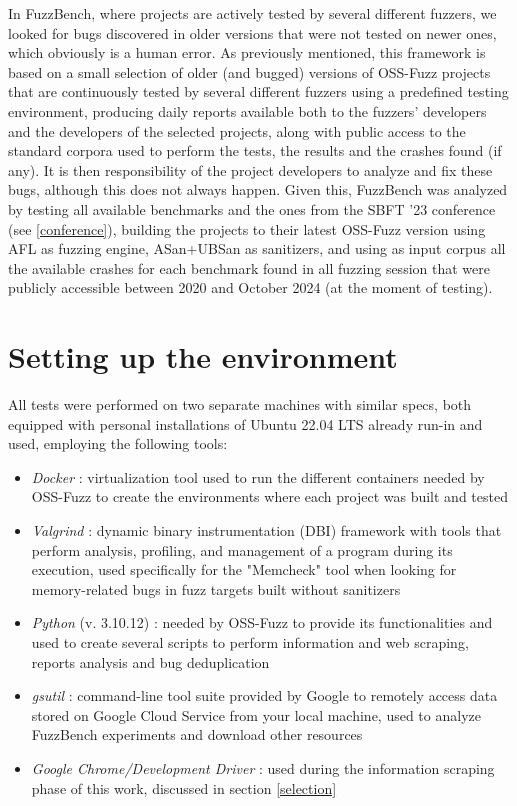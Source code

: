 In FuzzBench, where projects are actively tested by several different fuzzers, we looked for bugs discovered in older versions that were not tested on newer ones, which obviously is a human error. As previously mentioned, this framework is based on a small selection of older (and bugged) versions of OSS-Fuzz projects that are continuously tested by several different fuzzers using a predefined testing environment, producing daily reports available both to the fuzzers' developers and the developers of the selected projects, along with public access to the standard corpora used to perform the tests, the results and the crashes found (if any). It is then responsibility of the project developers to analyze and fix these bugs, although this does not always happen. Given this, FuzzBench was analyzed by testing all available benchmarks and the ones from the SBFT '23 conference (see \ref{conference}), building the projects to their latest OSS-Fuzz version using AFL as fuzzing engine, ASan+UBSan as sanitizers, and using as input corpus all the available crashes for each benchmark found in all fuzzing session that were publicly accessible between 2020 and October 2024 (at the moment of testing).


\section{Setting up the environment}
All tests were performed on two separate machines with similar specs, both equipped with personal installations of Ubuntu 22.04 LTS already run-in and used, employing the following tools:
\begin{itemize}
    \item \textit{Docker} \cite{Docker}: virtualization tool used to run the different containers needed by OSS-Fuzz to create the environments where each project was built and tested
    \item \textit{Valgrind} \cite{Valgrind_1}\cite{Valgrind_2}: dynamic binary instrumentation (DBI) framework with tools that perform analysis, profiling, and management of a program during its execution, used specifically for the "Memcheck" tool when looking for memory-related bugs in fuzz targets built without sanitizers
    \item \textit{Python} (v. 3.10.12) \cite{python}: needed by OSS-Fuzz to provide its functionalities and used to create several scripts to perform information and web scraping, reports analysis and bug deduplication
    \item \textit{gsutil} \cite{gsutil}: command-line tool suite provided by Google to remotely access data stored on Google Cloud Service from your local machine, used to analyze FuzzBench experiments and download other resources
    \item \textit{Google Chrome/Development Driver} \cite{driver}: used during the information scraping phase of this work, discussed in section \ref{selection}
\end{itemize}

